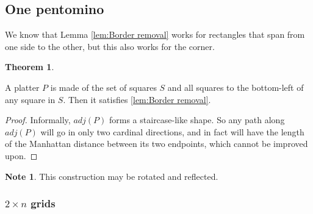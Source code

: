 \documentclass{article}
\theoremstyle{definition}%
\newtheorem{theorem}{Theorem}[section]
\newtheorem*{note}{Note}
\begin{document}
\subsection{One pentomino}

We know that Lemma \ref{lem:Border removal} works for rectangles that span from one side to the other, but this also works for the corner.

\begin{theorem}
\label{th:Corner removal}

A platter $P$ is made of the set of squares $S$ and all squares to the bottom-left of any square in $S$. Then it satisfies \ref{lem:Border removal}.
\end{theorem}

\begin{proof}
Informally, $adj(P)$ forms a staircase-like shape. So any path along $adj(P)$ will go in only two cardinal directions, and in fact will have the length of the Manhattan distance between its two endpoints, which cannot be improved upon.
\end{proof}

\begin{note}
This construction may be rotated and reflected.
\end{note}



\subsubsection{\texorpdfstring{$2 \times n$}{2 \texttimes n} grids}
\end{document}
